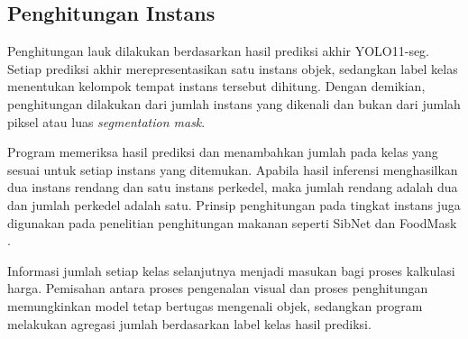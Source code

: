 \subsection{Penghitungan Instans}

Penghitungan lauk dilakukan berdasarkan hasil prediksi akhir YOLO11-seg. Setiap prediksi akhir merepresentasikan satu instans objek, sedangkan label kelas menentukan kelompok tempat instans tersebut dihitung. Dengan demikian, penghitungan dilakukan dari jumlah instans yang dikenali dan bukan dari jumlah piksel atau luas \textit{segmentation mask}.

Program memeriksa hasil prediksi dan menambahkan jumlah pada kelas yang sesuai untuk setiap instans yang ditemukan. Apabila hasil inferensi menghasilkan dua instans rendang dan satu instans perkedel, maka jumlah rendang adalah dua dan jumlah perkedel adalah satu. Prinsip penghitungan pada tingkat instans juga digunakan pada penelitian penghitungan makanan seperti SibNet dan FoodMask \cite{nguyen2022sibnet,nguyen2023foodmask}.

Informasi jumlah setiap kelas selanjutnya menjadi masukan bagi proses kalkulasi harga. Pemisahan antara proses pengenalan visual dan proses penghitungan memungkinkan model tetap bertugas mengenali objek, sedangkan program melakukan agregasi jumlah berdasarkan label kelas hasil prediksi.
